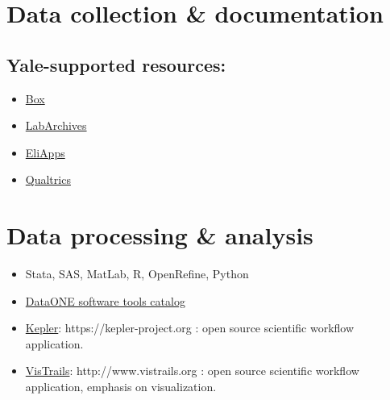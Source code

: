 \documentclass{tufte-handout}
\begin{document}
\section{Data collection \& documentation}\label{data-collection-documentation}

\subsection{Yale-supported resources:}\label{yale-supported}

\begin{itemize}
\item
  \href{http://its.yale.edu/services/collaboration-and-file-sharing/box-yale}{Box}
\item
  \href{http://its.yale.edu/services/research-technologies/elab-notebook/labarchives-faqs}{LabArchives}
\item
  \href{http://its.yale.edu/services/email-and-calendars/eliapps-google-apps-education}{EliApps}
\item
  \href{http://its.yale.edu/services/web-and-application-services/qualtrics-survey-tool}{Qualtrics}
\end{itemize}



\section{Data processing \& analysis}\label{data-processing-analysis}

\begin{itemize}
\itemsep1pt\parskip0pt
\item
  Stata, SAS, MatLab, R, OpenRefine, Python
\item
  \href{http://www.dataone.org/software_tools_catalog}{DataONE software tools catalog}
  \item
  \href{https://kepler-project.org}{Kepler}: https://kepler-project.org : open source scientific workflow  application.
\item
  \href{http://www.vistrails.org/index.php/Main_Page}{VisTrails}: http://www.vistrails.org : open source scientific workflow application, emphasis on visualization.
\end{itemize}
\end{document}
